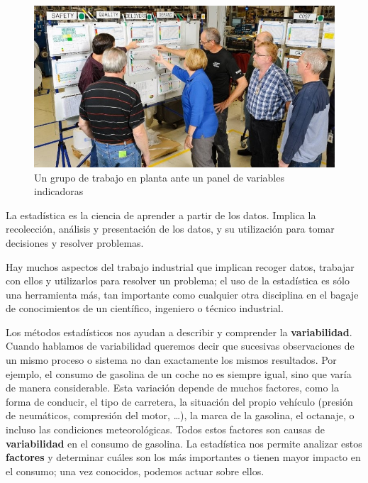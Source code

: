 \documentclass[
  letterpaper,
  DIV=11,
  numbers=noendperiod,
  oneside]{scrreprt}
\begin{document}
\begin{figure}

{\centering \includegraphics{01-imagenes/1520188654204.jpg}

}

\caption{Un grupo de trabajo en planta ante un panel de variables
indicadoras}

\end{figure}

La estadística es la ciencia de aprender a partir de los datos. Implica
la recolección, análisis y presentación de los datos, y su utilización
para tomar decisiones y resolver problemas.

Hay muchos aspectos del trabajo industrial que implican recoger datos,
trabajar con ellos y utilizarlos para resolver un problema; el uso de la
estadística es sólo una herramienta más, tan importante como cualquier
otra disciplina en el bagaje de conocimientos de un científico,
ingeniero o técnico industrial.

Los métodos estadísticos nos ayudan a describir y comprender la
\textbf{variabilidad}. Cuando hablamos de variabilidad queremos decir
que sucesivas observaciones de un mismo proceso o sistema no dan
exactamente los mismos resultados. Por ejemplo, el consumo de gasolina
de un coche no es siempre igual, sino que varía de manera considerable.
Esta variación depende de muchos factores, como la forma de conducir, el
tipo de carretera, la situación del propio vehículo (presión de
neumáticos, compresión del motor, \ldots), la marca de la gasolina, el
octanaje, o incluso las condiciones meteorológicas. Todos estos factores
son causas de \textbf{variabilidad} en el consumo de gasolina. La
estadística nos permite analizar estos \textbf{factores} y determinar
cuáles son los más importantes o tienen mayor impacto en el consumo; una
vez conocidos, podemos actuar sobre ellos.
\end{document}
